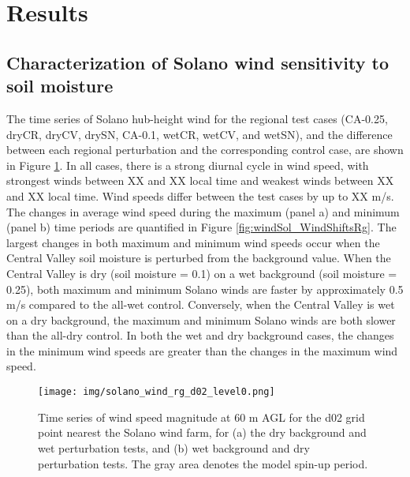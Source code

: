 
%
%
%
%
%

\section{Results}

\subsection{Characterization of Solano wind sensitivity to soil moisture}

The time series of Solano hub-height wind for the regional test cases (CA-0.25, dryCR, dryCV, drySN, CA-0.1, wetCR, wetCV, and wetSN), and the difference between each regional perturbation and the corresponding control case, are shown in Figure \ref{fig:windSol_TseriesWindRg}.  In all cases, there is a strong diurnal cycle in wind speed, with strongest winds between XX and XX local time and weakest winds between XX and XX local time.  Wind speeds differ between the test cases by up to XX m/s.  The changes in average wind speed during the maximum (panel a) and minimum (panel b) time periods are quantified in Figure \ref{fig:windSol_WindShiftsRg}.  The largest changes in both maximum and minimum wind speeds occur when the Central Valley soil moisture is perturbed from the background value.  When the Central Valley is dry (soil moisture = 0.1) on a wet background (soil moisture = 0.25), both maximum and minimum Solano winds are faster by approximately 0.5 m/s compared to the all-wet control.  Conversely, when the Central Valley is wet on a dry background, the maximum and minimum Solano winds are both slower than the all-dry control.  In both the wet and dry background cases, the changes in the minimum wind speeds are greater than the changes in the maximum wind speed.

\begin{figure}[here]
\texttt{[image: img/solano\_wind\_rg\_d02\_level0.png]}
\caption{Time series of wind speed magnitude at 60 m AGL for the d02 grid point nearest the Solano wind farm, for (a) the dry background and wet perturbation tests, and (b) wet background and dry perturbation tests.  The gray area denotes the model spin-up period.}
\label{fig:windSol_TseriesWindRg}
\end{figure}

